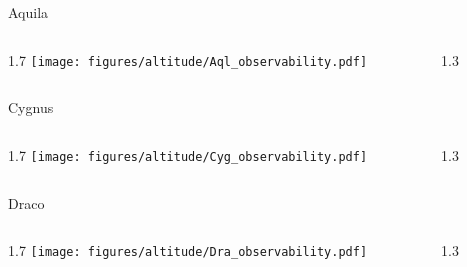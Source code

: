 \documentclass[final]{beamer}
\newlength{\colwidth}
\begin{document}
\begin{frame}[t]{}
    \Large{Aquila}
    \begin{columns}[T]
        \begin{column}{1.7\colwidth}
            \centering
            \texttt{[image: figures/altitude/Aql\_observability.pdf]}
        \end{column}
        \begin{column}{1.3\colwidth}
            \Large
            
        \end{column}
    \end{columns}

    \Large{Cygnus}
    \begin{columns}[T]
        \begin{column}{1.7\colwidth}
            \centering
            \texttt{[image: figures/altitude/Cyg\_observability.pdf]}
        \end{column}
        \begin{column}{1.3\colwidth}
            \Large
            
        \end{column}
    \end{columns}

    \Large{Draco}
    \begin{columns}[T]
        \begin{column}{1.7\colwidth}
            \centering
            \texttt{[image: figures/altitude/Dra\_observability.pdf]}
        \end{column}
        \begin{column}{1.3\colwidth}
            \Large
            
        \end{column}
    \end{columns}
\end{frame}

\end{document}
